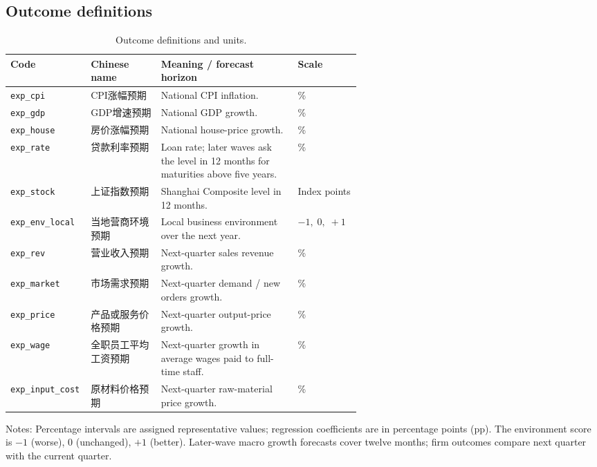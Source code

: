 \documentclass[11pt,letterpaper,english,final]{article}
\begin{document}
\subsection{Outcome definitions}
\begin{table}[H]
\centering
\small
\setlength{\tabcolsep}{5pt}
\caption{Outcome definitions and units.}
\begin{tabular}{lp{0.20\linewidth}p{0.39\linewidth}l}
\toprule
Code & Chinese name & Meaning / forecast horizon & Scale \\
\midrule
\texttt{exp\_cpi} & CPI涨幅预期 & National CPI inflation. & \% \\
\texttt{exp\_gdp} & GDP增速预期 & National GDP growth. & \% \\
\texttt{exp\_house} & 房价涨幅预期 & National house-price growth. & \% \\
\texttt{exp\_rate} & 贷款利率预期 & Loan rate; later waves ask the level in 12 months for maturities above five years. & \% \\
\texttt{exp\_stock} & 上证指数预期 & Shanghai Composite level in 12 months. & Index points \\
\texttt{exp\_env\_local} & 当地营商环境预期 & Local business environment over the next year. & $-1,\;0,\;+1$ \\
\texttt{exp\_rev} & 营业收入预期 & Next-quarter sales revenue growth. & \% \\
\texttt{exp\_market} & 市场需求预期 & Next-quarter demand / new orders growth. & \% \\
\texttt{exp\_price} & 产品或服务价格预期 & Next-quarter output-price growth. & \% \\
\texttt{exp\_wage} & 全职员工平均工资预期 & Next-quarter growth in average wages paid to full-time staff. & \% \\
\texttt{exp\_input\_cost} & 原材料价格预期 & Next-quarter raw-material price growth. & \% \\
\bottomrule
\end{tabular}
\par\vspace{4pt}\begin{minipage}{\linewidth}\footnotesize Notes: Percentage intervals are assigned representative values; regression coefficients are in percentage points (pp). The environment score is $-1$ (worse), $0$ (unchanged), $+1$ (better). Later-wave macro growth forecasts cover twelve months; firm outcomes compare next quarter with the current quarter.\end{minipage}
\end{table}
\end{document}
